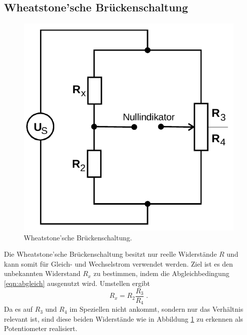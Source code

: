 \subsection{Wheatstone'sche Brückenschaltung}
\label{sec:wheatstone}
\begin{figure}[H]
    \centering
    \includegraphics[scale=0.4]{pictures/2-wheatstone.png}
    \caption{Wheatstone'sche Brückenschaltung. \cite{AP01}}
    \label{fig:wheatstone}
\end{figure}
\noindent
Die Wheatstone'sche Brückenschaltung besitzt nur reelle Widerstände $R$ und kann somit für Gleich- und Wechselstrom verwendet werden.
Ziel ist es den unbekannten Widerstand $R_x$ zu bestimmen, indem die Abgleichbedingung \eqref{eqn:abgleich} ausgenutzt wird. Umstellen
ergibt
\begin{equation}
    R_x=R_2\frac{R_3}{R_4} \;.
    \label{eqn:wheatstone}
\end{equation}
Da es auf $R_3$ und $R_4$ im Speziellen nicht ankommt, sondern nur das Verhältnis relevant ist, sind diese beiden Widerstände wie in
Abbildung \ref{fig:wheatstone} zu erkennen als Potentiometer realisiert.

